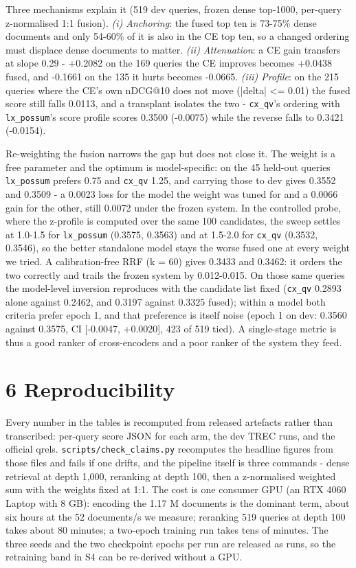 \documentclass[11pt]{article}
\begin{document}
Three mechanisms explain it (519 dev queries, frozen dense top-1000, per-query z-normalised 1:1 fusion). \emph{(i) Anchoring}: the fused top ten is 73-75\% dense documents and only 54-60\% of it is also in the CE top ten, so a changed ordering must displace dense documents to matter. \emph{(ii) Attenuation}: a CE gain transfers at slope 0.29 - +0.2082 on the 169 queries the CE improves becomes +0.0438 fused, and -0.1661 on the 135 it hurts becomes -0.0665. \emph{(iii) Profile}: on the 215 queries where the CE’s own nDCG@10 does not move (|delta| <= 0.01) the fused score still falls 0.0113, and a transplant isolates the two - \texttt{cx\_qv}’s ordering with \texttt{lx\_possum}’s score profile scores 0.3500 (-0.0075) while the reverse falls to 0.3421 (-0.0154).

Re-weighting the fusion narrows the gap but does not close it. The weight is a free parameter and the optimum is model-specific: on the 45 held-out queries \texttt{lx\_possum} prefers 0.75 and \texttt{cx\_qv} 1.25, and carrying those to dev gives 0.3552 and 0.3509 - a 0.0023 loss for the model the weight was tuned for and a 0.0066 gain for the other, still 0.0072 under the frozen system. In the controlled probe, where the z-profile is computed over the same 100 candidates, the sweep settles at 1.0-1.5 for \texttt{lx\_possum} (0.3575, 0.3563) and at 1.5-2.0 for \texttt{cx\_qv} (0.3532, 0.3546), so the better standalone model stays the worse fused one at every weight we tried. A calibration-free RRF (k = 60) gives 0.3433 and 0.3462: it orders the two correctly and trails the frozen system by 0.012-0.015. On those same queries the model-level inversion reproduces with the candidate list fixed (\texttt{cx\_qv} 0.2893 alone against 0.2462, and 0.3197 against 0.3325 fused); within a model both criteria prefer epoch 1, and that preference is itself noise (epoch 1 on dev: 0.3560 against 0.3575, CI [-0.0047, +0.0020], 423 of 519 tied). A single-stage metric is thus a good ranker of cross-encoders and a poor ranker of the system they feed.

\section*{6 Reproducibility}
Every number in the tables is recomputed from released artefacts rather than transcribed: per-query score JSON for each arm, the dev TREC runs, and the official qrels. \texttt{scripts/check\_claims.py} recomputes the headline figures from those files and fails if one drifts, and the pipeline itself is three commands - dense retrieval at depth 1,000, reranking at depth 100, then a z-normalised weighted sum with the weights fixed at 1:1. The cost is one consumer GPU (an RTX 4060 Laptop with 8 GB): encoding the 1.17 M documents is the dominant term, about six hours at the 52 documents/s we measure; reranking 519 queries at depth 100 takes about 80 minutes; a two-epoch training run takes tens of minutes. The three seeds and the two checkpoint epochs per run are released as runs, so the retraining band in S4 can be re-derived without a GPU.
\end{document}
